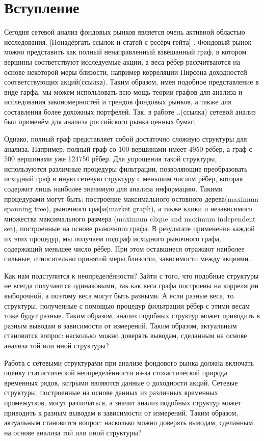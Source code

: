 \section{Вступление}

Сегодня сетевой анализ фондовых рынков является очень активной областью исследования. [Понадёргать ссылок и статей с ресёрч гейта] . Фондовый рынок можно представить как полный ненаправленный взвешанный граф, в котором вершины соответствуют исследуемые акции, а веса рёбер рассчитваются на основе некоторой меры близости, например корреляции Пирсона доходностей соответствующих акций(ссылка). Таким образом, имея подобное представление в виде гарфа, мы можем использовать всю мощь теории графов для анализа и исследования закономерностей и трендов фондовых рынков, а также для составления более дохожных портфелей.  Так, в работе ..(ссылка) сетевой анализ был применём для анализа российского рынка ценных бумаг. 
 

Однако, полный граф представляет собой достаточно сложную структуры для анализа. Например, полный граф со 100 вершинами имеет 4950 рёбер, а граф с 500 вершинами уже 124750 рёбер. Для упрощения такой структуры, используются различные процедуры фильтрации, позволяющие преобразовать исходный граф в иную сетевую структуру с меньшим числом рёбер, которая содержит лишь наиболее значимую для анализа информацию. Такими процедурами могут быть: построение максимального остовного дерева(maximum spanning tree), рыночного графа(market graph), а также клики и независимого множества максимального размера (maximum clique and maximum independent set), построенные на основе рыночного графа. В результате применения каждой их этих процедур, мы получаем подграф исходного рыночного графа, содержащий меньшее число рёбер. При этом оставшиеся отражают наиболее сильные, относительно принятой меры близости, зависимости между акциями.


Как нам подступится к неопределённости? Зайти с того, что подобные структуры не всегда получаются одинаковыми, так как веса графа построены на корреляции выборочной, а поэтому веса могут быть разными. А если разные веса, то структуры, полученные с помощью процедур фильтрации рёбер с этими весам тоже будут разные. Таким образом, анализ подобных структур может приводить в разным выводам в зависимости от измерений. Таким образом, актуальным становится вопрос: насколько можно доверять выводам, сделанным на основе анализа той или иной структуры? 

Работа с сетевыми структурами при анализе фондового рынка  должна включать оценку статистической неопределённости из-за стохастической природа временных рядов, котрыми являются данные о доходности акций. Сетевые структуры, построенные на основе данных из различных временных промежутков, могут различаться, а значит анализ подобных структур может приводить к разным выводам в зависимости от измерений. Таким образом, актуальным становится вопрос: насколько можно доверять выводам, сделанным на основе анализа той или иной структуры? 

